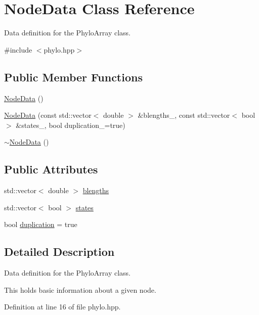\hypertarget{class_node_data}{}\section{Node\+Data Class Reference}
\label{class_node_data}


Data definition for the {\ttfamily Phylo\+Array} class.  




{\ttfamily \#include $<$phylo.\+hpp$>$}

\subsection*{Public Member Functions}
\begin{DoxyCompactItemize}
\item 
\hyperlink{class_node_data_a56da12a9de7c80c25a905012749c8671}{Node\+Data} ()
\item 
\hyperlink{class_node_data_a0a90191ba4c987afa3406f829967d8e2}{Node\+Data} (const std\+::vector$<$ double $>$ \&blengths\+\_\+, const std\+::vector$<$ bool $>$ \&states\+\_\+, bool duplication\+\_\+=true)
\item 
\hyperlink{class_node_data_ad870d466c40b9be96ad79adccab79038}{$\sim$\+Node\+Data} ()
\end{DoxyCompactItemize}
\subsection*{Public Attributes}
\begin{DoxyCompactItemize}
\item 
std\+::vector$<$ double $>$ \hyperlink{class_node_data_a02da5f097c105813216d87ef89ad7bd4}{blengths}
\item 
std\+::vector$<$ bool $>$ \hyperlink{class_node_data_a33caaadde6afe892624501bdb0edaea6}{states}
\item 
bool \hyperlink{class_node_data_a6c21d52091bb4fa6e3d431856da17caa}{duplication} = true
\end{DoxyCompactItemize}


\subsection{Detailed Description}
Data definition for the {\ttfamily Phylo\+Array} class. 

This holds basic information about a given node. 

Definition at line 16 of file phylo.\+hpp.



